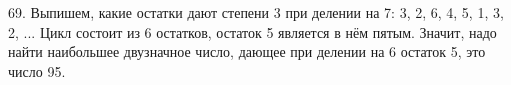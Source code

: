 69. Выпишем, какие остатки дают степени 3 при делении на 7: 3, 2, 6, 4, 5, 1, 3, 2, ... Цикл состоит из 6 остатков, остаток 5 является в нём пятым. Значит, надо найти наибольшее двузначное число, дающее при делении на 6 остаток 5, это число 95.\\
